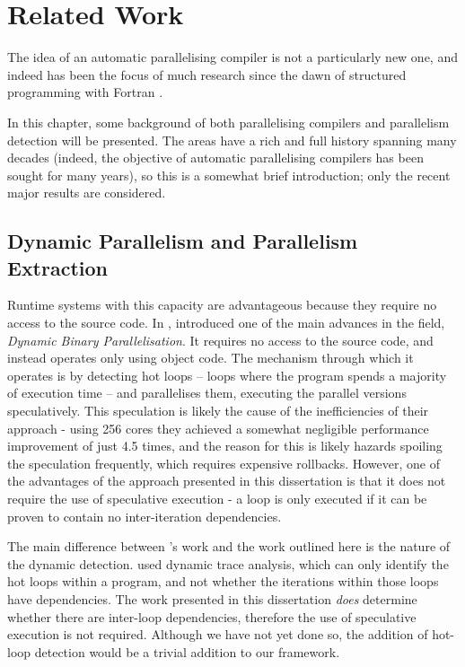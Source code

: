 \chapter{Related Work} \label{chp:related}
The idea of an automatic parallelising compiler is not a particularly new one, and indeed has been the focus of much research since the dawn of structured programming with Fortran \citep{Backus1979}.

In this chapter, some background of both parallelising compilers and parallelism detection will be presented. The areas have a rich and full history spanning many decades (indeed, the objective of automatic parallelising compilers has been sought for many years), so this is a somewhat brief introduction; only the recent major results are considered.

\section{Dynamic Parallelism and Parallelism Extraction} \label{sec:related/compilers}
Runtime systems with this capacity are advantageous because they require no access to the source code. In \citeyear{Yang2011}, \citet{Yang2011} introduced one of the main advances in the field, \textit{Dynamic Binary Parallelisation}. It requires no access to the source code, and instead operates only using object code. The mechanism through which it operates is by detecting hot loops -- loops where the program spends a majority of execution time -- and parallelises them, executing the parallel versions speculatively. This speculation is likely the cause of the inefficiencies of their approach - using 256 cores they achieved a somewhat negligible performance improvement of just 4.5 times, and the reason for this is likely hazards spoiling the speculation frequently, which requires expensive rollbacks. However, one of the advantages of the approach presented in this dissertation is that it does not require the use of speculative execution - a loop is only executed if it can be proven to contain no inter-iteration dependencies.

The main difference between \citeauthor{Yang2011}'s work and the work outlined here is the nature of the dynamic detection. \citeauthor{Yang2011} used dynamic trace analysis, which can only identify the hot loops within a program, and not whether the iterations within those loops have dependencies. The work presented in this dissertation \emph{does} determine whether there are inter-loop dependencies, therefore the use of speculative execution is not required. Although we have not yet done so, the addition of hot-loop detection would be a trivial addition to our framework.

